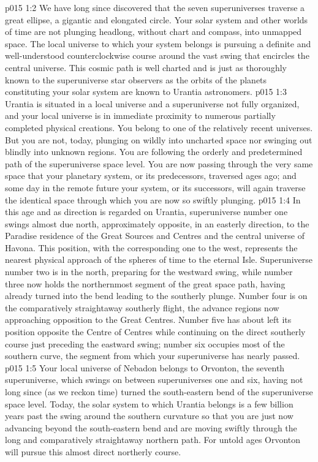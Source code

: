 \vs p015 1:2 We have long since discovered that the seven superuniverses traverse a great ellipse, a gigantic and elongated circle. Your solar system and other worlds of time are not plunging headlong, without chart and compass, into unmapped space. The local universe to which your system belongs is pursuing a definite and well\hyp{}understood counterclockwise course around the vast swing that encircles the central universe. This cosmic path is well charted and is just as thoroughly known to the superuniverse star observers as the orbits of the planets constituting your solar system are known to Urantia astronomers.
\vs p015 1:3 Urantia is situated in a local universe and a superuniverse not fully organized, and your local universe is in immediate proximity to numerous partially completed physical creations. You belong to one of the relatively recent universes. But you are not, today, plunging on wildly into uncharted space nor swinging out blindly into unknown regions. You are following the orderly and predetermined path of the superuniverse space level. You are now passing through the very same space that your planetary system, or its predecessors, traversed ages ago; and some day in the remote future your system, or its successors, will again traverse the identical space through which you are now so swiftly plunging.
\vs p015 1:4 \pc In this age and as direction is regarded on Urantia, superuniverse number one swings almost due north, approximately opposite, in an easterly direction, to the Paradise residence of the Great Sources and Centres and the central universe of Havona. This position, with the corresponding one to the west, represents the nearest physical approach of the spheres of time to the eternal Isle. Superuniverse number two is in the north, preparing for the westward swing, while number three now holds the northernmost segment of the great space path, having already turned into the bend leading to the southerly plunge. Number four is on the comparatively straightaway southerly flight, the advance regions now approaching opposition to the Great Centres. Number five has about left its position opposite the Centre of Centres while continuing on the direct southerly course just preceding the eastward swing; number six occupies most of the southern curve, the segment from which your superuniverse has nearly passed.
\vs p015 1:5 Your local universe of Nebadon belongs to Orvonton, the seventh superuniverse, which swings on between superuniverses one and six, having not long since (as we reckon time) turned the south\hyp{}eastern bend of the superuniverse space level. Today, the solar system to which Urantia belongs is a few billion years past the swing around the southern curvature so that you are just now advancing beyond the south\hyp{}eastern bend and are moving swiftly through the long and comparatively straightaway northern path. For untold ages Orvonton will pursue this almost direct northerly course.
